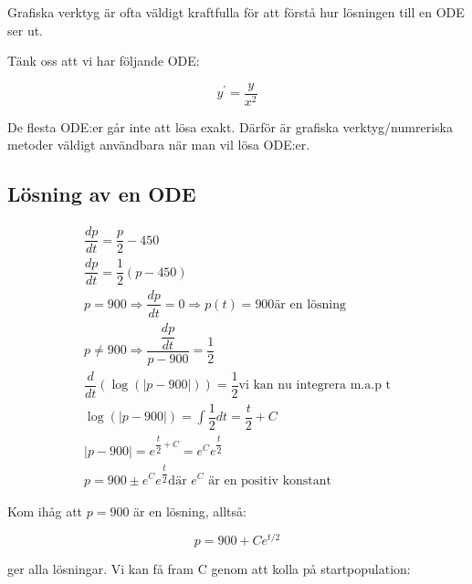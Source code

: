 \noindent Grafiska verktyg är ofta väldigt kraftfulla för att förstå hur lösningen till en ODE ser ut.\par
Tänk oss att vi har följande ODE:


\begin{equation*}
  y^{\prime}= \dfrac{y}{x^2}
\end{equation*}
\par\bigskip

\noindent De flesta ODE:er går inte att lösa exakt. Därför är grafiska verktyg/numreriska metoder väldigt användbara när man vil lösa ODE:er.
\par\bigskip

\subsection{Lösning av en ODE}
\par\bigskip


\begin{equation*}
  \begin{gathered}
    \dfrac{dp}{dt}=\dfrac{p}{2}-450\\
    \dfrac{dp}{dt}=\dfrac{1}{2}(p-450)\\
    p=900 \Rightarrow \dfrac{dp}{dt}=0 \Rightarrow p(t)=900 \text{är en lösning}\\
    p\neq 900 \Rightarrow \dfrac{\dfrac{dp}{dt}}{p-900}=\dfrac{1}{2}\\
    \dfrac{d}{dt}(\log(|p-900|))=\dfrac{1}{2} \text{vi kan nu integrera m.a.p t}\\
    \log(|p-900|)=\int\dfrac{1}{2}dt=\dfrac{t}{2}+C\\
    |p-900|=e^{\dfrac{t}{2}+C}=e^Ce^{\dfrac{t}{2}}\\
    p=900 \pm e^Ce^{\dfrac{t}{2}} \text{där $e^C$ är en positiv konstant}
  \end{gathered}
\end{equation*}
\par\bigskip

Kom ihåg att $p=900$ är en lösning, alltså:
\par\bigskip

\begin{equation*}
  p=900+Ce^{t/2}
\end{equation*}
\par\bigskip

ger alla lösningar. Vi kan få fram C genom att kolla på startpopulation:
\par\bigskip


